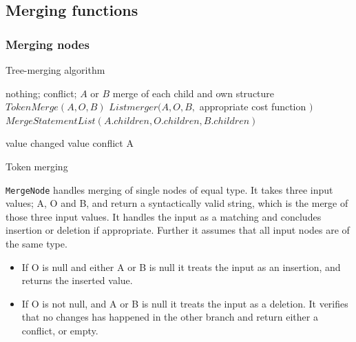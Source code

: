 \documentclass[11pt]{article}
\begin{document}
\subsection{Merging functions}

\label{MergingFunction}
\subsubsection{Merging nodes}
\begin{algorithm}
\caption{Tree-merging algorithm}
\label{MergeNode}
\begin{algorithmic}
            \State \Return nothing;
        \Else
            \State \Return conflict;
        \EndIf
    \EndIf
        \State \Return $A$ or $B$
    \EndIf
        \State \Return merge of each child and own structure
    \EndIf
        \State \Return $TokenMerge(A, O, B)$
    \EndIf
        \State \Return $Listmerger(A, O, B, $ appropriate cost function $)$
    \EndIf
        \State \Return $MergeStatementList(A.children, O.children, B.children)$
    \EndIf
\EndFunction
\end{algorithmic}
\end{algorithm}


\begin{algorithm}
\begin{algorithmic}
        \State \Return value
    \EndIf
        \State \Return changed value
    \EndIf
            \State \Return conflict
	    \EndIf
        \State \Return A
    \EndIf
\EndFunction
\end{algorithmic}
  \caption{Token merging}
  \label{MergeToken}
\end{algorithm}


\texttt{MergeNode} handles merging of single nodes of equal type. It takes three input values; A, O and B, and return a syntactically valid string, which is the merge of those three input values. It handles the input as a matching and concludes insertion or deletion if appropriate. Further it assumes that all input nodes are of the same type.

\begin{itemize}
   \item If O is null and either A or B is null it treats the input as an insertion, and returns the inserted value.
   \item If O is not null, and A or B is null it treats the input as a deletion. It verifies that no changes has happened in the other branch and return either a conflict, or empty.
\end{itemize}
\end{document}
